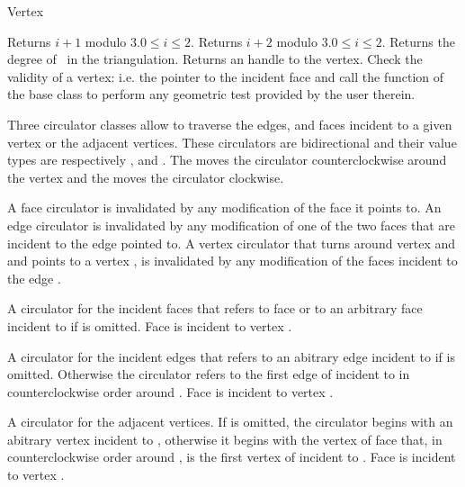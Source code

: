 \begin{ccClass}{Vertex}

{Returns $i+1$ modulo 3.\ccPrecond $0\leq i \leq 2$.}
\ccGlue
{}
{Returns $i+2$ modulo 3.\ccPrecond $0\leq i \leq 2$.}
\ccGlue
{}
{Returns the degree of \ccVar\ in the triangulation.}
\ccGlue
{}
{Returns an handle to the vertex.}
\ccGlue
{} 
{Check the validity of a vertex:
i.e. the pointer to the incident face  and call the 
function of the base class to perform any geometric test provided by the user
therein.}



Three circulator classes allow to traverse the edges, and faces
incident to a given vertex or  the adjacent vertices.
 These circulators are bidirectional
and their value types are respectively , 
and .
The   moves the circulator
counterclockwise around the vertex 
and  the  moves the circulator
clockwise. 

A face circulator is invalidated by any modification of the face it
points to. An edge circulator is invalidated
by any modification of one of the two faces that are incident to the edge
pointed to.  A vertex circulator that turns around vertex 
and and points  to a vertex , is invalidated
by any modification of the faces incident to the edge .




{A circulator for the  incident faces 
that refers to face  or to an arbitrary face
incident to   if  is omitted.
\ccPrecond Face  is incident to vertex .}

{A circulator for the incident edges that refers to an abitrary edge incident
to  if  is omitted. Otherwise the circulator refers
to the first edge of 
incident
to  in counterclockwise order around .
\ccPrecond Face  is incident to vertex . }

{A circulator for the adjacent vertices.
If  is omitted, the circulator begins with
 an abitrary vertex incident
to , otherwise it begins with the
vertex of face  that, 
in counterclockwise order around ,
is the first vertex of  incident to .
\ccPrecond Face  is incident to vertex .}


\end{ccClass} 

